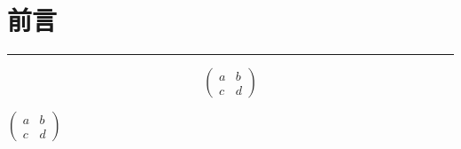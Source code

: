 \documentclass[12pt]{ctexbook}
\begin{document}



\tableofcontents

\chapter{前言}






















\hrule




\[ \begin{pmatrix}a & b\\ c & d\end{pmatrix} \]

$\begin{pmatrix}
  a & b\\ 
  c & d
\end{pmatrix}$






\end{document}
